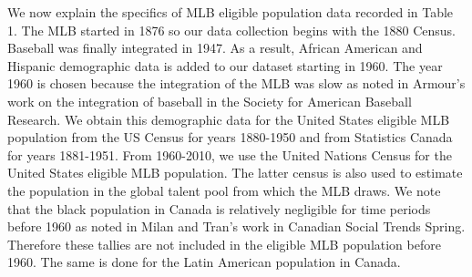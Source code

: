 \documentclass[11pt]{article}\usepackage[]{graphicx}\usepackage[]{color}
\begin{document}
We now explain the specifics of MLB eligible population data recorded in 
Table 1. 
The MLB started in 1876 so our data collection begins with the 
1880 Census. Baseball was finally integrated in 1947.  As a result, 
African American and Hispanic demographic data is added to our dataset 
starting in 1960. The year 1960 is chosen because the integration of the MLB 
was slow as noted in Armour's work on the integration of baseball in the 
Society for American Baseball Research. %
We obtain this demographic data for the United States 
eligible MLB population from the US Census for years 1880-1950 %
and from Statistics Canada for years 1881-1951. %
From 1960-2010, we use the United Nations Census %
for the United States eligible MLB population.  The latter census is also used 
to estimate the population in the global talent pool from which the MLB draws.  
We note that the black population in Canada is relatively negligible for time 
periods before 1960 as noted in Milan and Tran's work in Canadian Social 
Trends Spring. %
Therefore these tallies are not included in the eligible MLB population 
before 1960.  The same is done for the Latin American population in Canada.  



\end{document}
